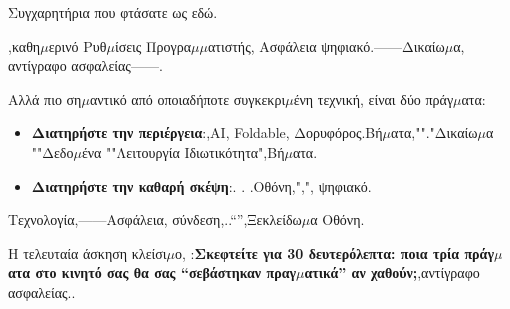 
Συγχαρητήρια που φτάσατε ως εδώ.

,καθη$\mu$ερινό Ρυθ$\mu$ίσεις Προγρα$\mu$$\mu$ατιστής, Ασφάλεια ψηφιακό.——Δικαίω$\mu$α, αντίγραφο ασφαλείας——.

Αλλά πιο ση$\mu$αντικό από οποιαδήποτε συγκεκρι$\mu$ένη τεχνική, είναι δύο πράγ$\mu$ατα:

\begin{itemize}
  \item \textbf{Διατηρήστε την περιέργεια}:,AI, Foldable, Δορυφόρος.Βή$\mu$ατα,""."Δικαίω$\mu$α ""Δεδο$\mu$ένα ""Λειτουργία Ιδιωτικότητα",Βή$\mu$ατα.
  \item \textbf{Διατηρήστε την καθαρή σκέψη}:. . .Οθόνη,",", ψηφιακό.
\end{itemize}

Τεχνολογία,——Ασφάλεια, σύνδεση,..“”,Ξεκλείδω$\mu$α Οθόνη.

\begin{tcbpractice}{Η τελευταία άσκηση}
κλείσι$\mu$ο, :\textbf{Σκεφτείτε για 30 δευτερόλεπτα: ποια τρία πράγ$\mu$ατα στο κινητό σας θα σας “σεβάστηκαν πραγ$\mu$ατικά” αν χαθούν;},αντίγραφο ασφαλείας..

\end{tcbpractice}
